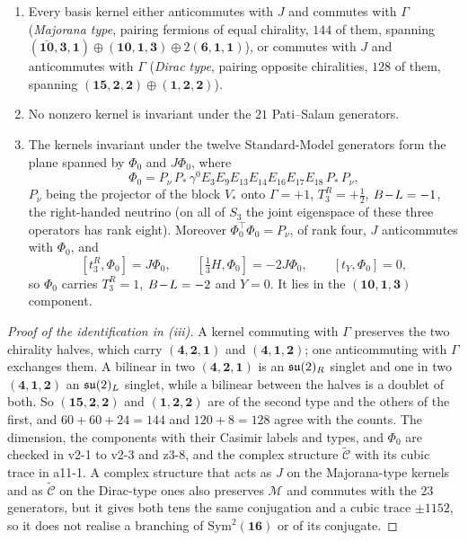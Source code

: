 \begin{theorem}
\begin{enumerate}[label=(\roman*),leftmargin=2.2em]
$-\widetilde{\mathcal C}$ conjugates every label. As a real representation the two components with $\mathbf{10}$ are irreducible of complex type, while
$(\mathbf{15},\mathbf2,\mathbf2)$, $(\mathbf6,\mathbf1,\mathbf1)$ and $(\mathbf1,\mathbf2,\mathbf2)$ are of real type and occur with multiplicities $2$, $4$ and $2$.
\item Every basis kernel either anticommutes with $J$ and commutes with $\Gamma$ (\emph{Majorana type}, pairing fermions of equal chirality, $144$ of
them, spanning $(\bar{\mathbf{10}},\mathbf3,\mathbf1)\oplus(\mathbf{10},\mathbf1,\mathbf3)\oplus2(\mathbf6,\mathbf1,\mathbf1)$), or commutes with $J$ and anticommutes with
$\Gamma$ (\emph{Dirac type}, pairing opposite chiralities, $128$ of them, spanning $(\mathbf{15},\mathbf2,\mathbf2)\oplus(\mathbf1,\mathbf2,\mathbf2)$).
\item No nonzero kernel is invariant under the $21$ Pati--Salam generators.
\item The kernels invariant under the twelve Standard-Model generators form the plane spanned by $\Phi_0$ and $J\Phi_0$, where
\begin{equation}
\label{eq:Phi0}
\Phi_0=P_\nu\,P_*\,\gamma^0E_3E_9E_{13}E_{14}E_{16}E_{17}E_{18}\,P_*\,P_\nu ,
\end{equation}
$P_\nu$ being the projector of the block $V_*$ onto $\Gamma=+1$, $T^R_3=+\tfrac12$, $B\!-\!L=-1$, the right-handed neutrino (on all of $S_3$
the joint eigenspace of these three operators has rank eight). Moreover $\Phi_0^{\!\top}\Phi_0=P_\nu$, of rank
four, $J$ anticommutes with $\Phi_0$, and
\[
[t^R_3,\Phi_0]=J\Phi_0,\qquad [\tfrac13H,\Phi_0]=-2J\Phi_0,\qquad [t_Y,\Phi_0]=0,
\]
so $\Phi_0$ carries $T^R_3=1$, $B\!-\!L=-2$ and $Y=0$. It lies in the $(\mathbf{10},\mathbf1,\mathbf3)$ component.
\end{enumerate}
\end{theorem}

\begin{proof}[Proof of the identification in (iii)]
A kernel commuting with $\Gamma$ preserves the two chirality halves, which carry $(\mathbf4,\mathbf2,\mathbf1)$ and $(\mathbf4,\mathbf1,\mathbf2)$; one anticommuting with
$\Gamma$ exchanges them. A bilinear in two $(\mathbf4,\mathbf2,\mathbf1)$ is an $\mathfrak{su}(2)_R$ singlet and one in two $(\mathbf4,\mathbf1,\mathbf2)$ an $\mathfrak{su}(2)_L$ singlet, while a
bilinear between the halves is a doublet of both. So $(\mathbf{15},\mathbf2,\mathbf2)$ and $(\mathbf1,\mathbf2,\mathbf2)$ are of the second type and the others of
the first, and $60+60+24=144$ and $120+8=128$ agree with the counts. The dimension, the components with their Casimir labels and types,
and $\Phi_0$ are checked in v2-1 to v2-3 and z3-8, and the complex structure $\widetilde{\mathcal C}$ with its cubic trace in a11-1. A complex structure
that acts as $J$ on the Majorana-type kernels and as $\widetilde{\mathcal C}$ on the Dirac-type ones also preserves $\mathcal M$ and commutes with the $23$
generators, but it gives both tens the same conjugation and a cubic trace $\pm1152$, so it does not realise a branching of $\mathrm{Sym}^2(\mathbf{16})$ or of its
conjugate.
\end{proof}

